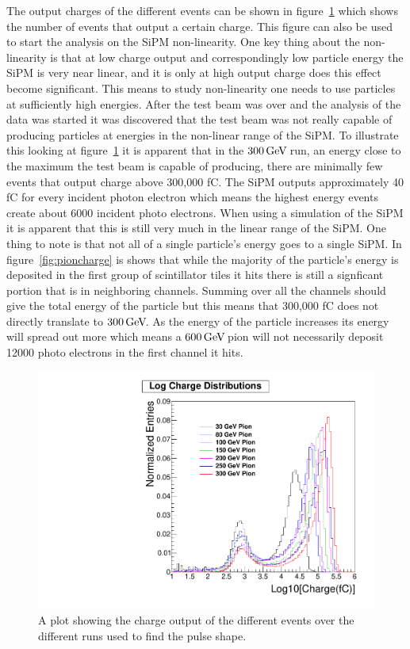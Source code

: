 The output charges of the different events can be shown in figure~\ref{fig:Log} which shows the number of events that output a certain charge. This figure can also be used to start the analysis on the SiPM non-linearity. One key thing about the non-linearity is that at low charge output and correspondingly low particle energy the SiPM is very near linear, and it is only at high output charge does this effect become significant. This means to study non-linearity one needs to use particles at sufficiently high energies. After the test beam was over and the analysis of the data was started it was discovered that the test beam was not really capable of producing particles at energies in the non-linear range of the SiPM. To illustrate this looking at figure~\ref{fig:Log} it is apparent that in the $300{\,\text{Ge\hspace{-.08em}V\hspace{-0.16em}}}$ run, an energy close to the maximum the test beam is capable of producing, there are minimally few events that output charge above 300,000 fC. The SiPM outputs approximately 40 fC for every incident photon electron which means the highest energy events create about 6000 incident photo electrons. When using a simulation of the SiPM it is apparent that this is still very much in the linear range of the SiPM. One thing to note is that not all of a single particle's energy goes to a single SiPM. In figure~\ref{fig:pioncharge} is shows that while the majority of the particle's energy is deposited in the first group of scintillator tiles it hits there is still a signficant portion that is in neighboring channels. Summing over all the channels should give the total energy of the particle but this means that 300,000 fC does not directly translate to $300{\,\text{Ge\hspace{-.08em}V\hspace{-0.16em}}}$. As the energy of the particle increases its energy will spread out more which means a $600{\,\text{Ge\hspace{-.08em}V\hspace{-0.16em}}}$ pion will not necessarily deposit 12000 photo electrons in the first channel it hits.

\begin{figure}
\centering
\includegraphics[width=0.8\linewidth]{Figures/Logplot.pdf}
\caption{A plot showing the charge output of the different events over the different runs used to find the pulse shape.}
\label{fig:Log}
\end{figure}

